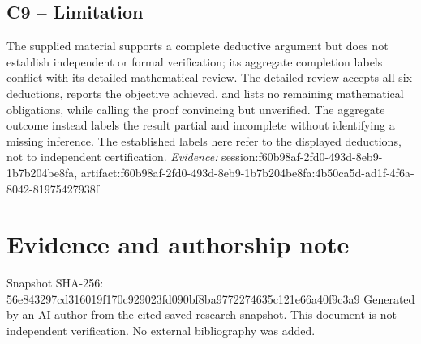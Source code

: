 \documentclass[11pt]{article}
\begin{document}
\subsection{C9 -- Limitation}
The supplied material supports a complete deductive argument but does not establish independent or formal verification; its aggregate completion labels conflict with its detailed mathematical review.
The detailed review accepts all six deductions, reports the objective achieved, and lists no remaining mathematical obligations, while calling the proof convincing but unverified. The aggregate outcome instead labels the result partial and incomplete without identifying a missing inference. The established labels here refer to the displayed deductions, not to independent certification.
\textit{Evidence: }session:f60b98af-2fd0-493d-8eb9-1b7b204be8fa, artifact:f60b98af-2fd0-493d-8eb9-1b7b204be8fa:4b50ca5d-ad1f-4f6a-8042-81975427938f
\section*{Evidence and authorship note}
Snapshot SHA-256: 56e843297cd316019f170c929023fd090bf8ba9772274635c121e66a40f9c3a9
Generated by an AI author from the cited saved research snapshot. This document is not independent verification. No external bibliography was added.
\end{document}
